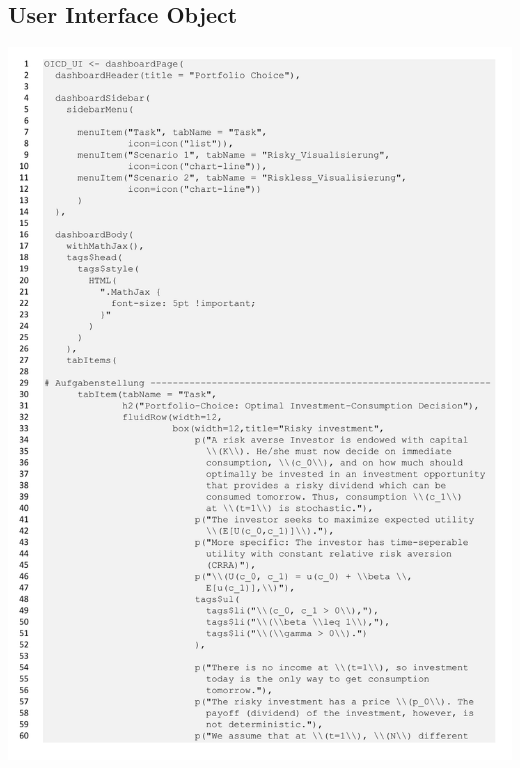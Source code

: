 \hypertarget{User interface}{}
\subsection*{User Interface Object}
\begin{center}
    \includegraphics[scale=0.75, page = 1]{files/UI.pdf}
    \newpage

\end{center}
